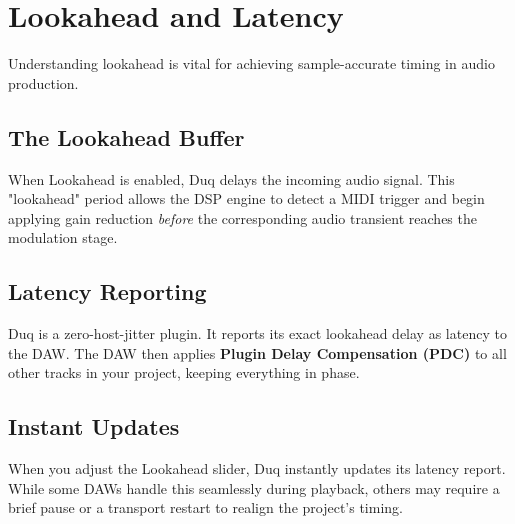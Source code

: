 \chapter{Lookahead and Latency}
\label{ch:lookahead_latency}

Understanding lookahead is vital for achieving sample-accurate timing in audio production.

\section{The Lookahead Buffer}
When Lookahead is enabled, Duq delays the incoming audio signal. This "lookahead" period allows the DSP engine to detect a MIDI trigger and begin applying gain reduction \textit{before} the corresponding audio transient reaches the modulation stage.

\section{Latency Reporting}
Duq is a zero-host-jitter plugin. It reports its exact lookahead delay as latency to the DAW. The DAW then applies \textbf{Plugin Delay Compensation (PDC)} to all other tracks in your project, keeping everything in phase.

\section{Instant Updates}
When you adjust the Lookahead slider, Duq instantly updates its latency report. While some DAWs handle this seamlessly during playback, others may require a brief pause or a transport restart to realign the project's timing.
